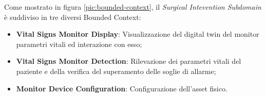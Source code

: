 Come mostrato in figura     \ref{pic:bounded-context}, il \textit{Surgical Intevention Subdomain} è suddiviso in tre diversi Bounded Context:

\begin{itemize}
    \item \textbf{Vital Signs Monitor Display}: Visualizzazione del digital twin del monitor parametri vitali ed interazione con esso;
    \item \textbf{Vital Signs Monitor Detection}: Rilevazione dei parametri vitali del paziente e della verifica del superamento delle soglie di allarme;
    \item \textbf{Monitor Device Configuration}: Configurazione dell'asset fisico. 
\end{itemize}